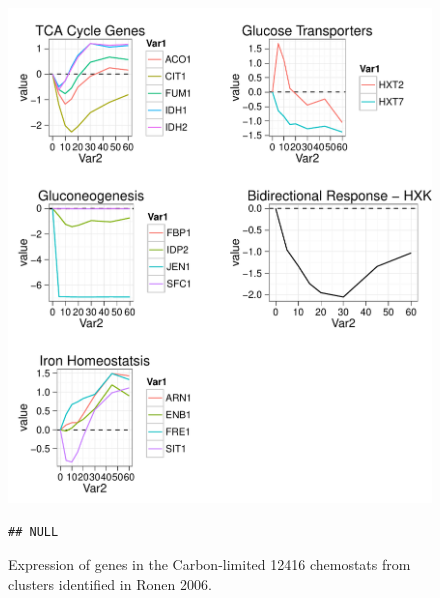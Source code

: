 \documentclass[letter]{article}\usepackage{graphicx, color}
\makeatletter
\def\maxwidth{ %
  \ifdim\Gin@nat@width>\linewidth
    \linewidth
  \else
    \Gin@nat@width
  \fi
}
\newenvironment{kframe}{%
 \def\FrameCommand##1{\hskip\@totalleftmargin \hskip-\fboxsep
 \colorbox{shadecolor}{##1}\hskip-\fboxsep
     \hskip-\linewidth \hskip-\@totalleftmargin \hskip\columnwidth}%
 \MakeFramed {\advance\hsize-\width
   \@totalleftmargin\z@ \linewidth\hsize
   \@setminipage}}%
 {\par\unskip\endMakeFramed}
\newenvironment{knitrout}{}{} %
\makeatother
\begin{document}
\begin{figure}
\centering
\begin{knitrout}
\color{fgcolor}\includegraphics[width=\maxwidth]{figure/ronengenes} \begin{kframe}\begin{verbatim}
## NULL
\end{verbatim}
\end{kframe}
\end{knitrout}

\caption{Expression of genes in the Carbon-limited 12416 chemostats from clusters identified in Ronen 2006.}
\end{figure}
\end{document}
